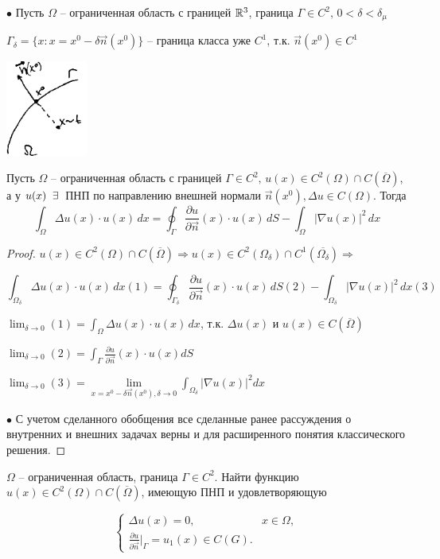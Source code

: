 $\bullet$ Пусть $\Omega$ -- ограниченная область с границей $\mathbb{R}^3$, граница $\Gamma \in C^2, \, 0 < \delta < \delta_{\mu}$

$\Gamma_{\delta} = \{x: x = x^0 - \delta \vec{n}(x^0)\}$ -- граница класса уже $C^1$, т.к. $\vec{n}(x^0) \in C^1$
\begin{center}
\includegraphics[width=0.2\textwidth]{32_2_new}
\end{center}
\begin{lemma}
Пусть $\Omega$ -- ограниченная область с границей $\Gamma \in C^2, \, u(x) \in C^2(\Omega) \cap C(\overline{\Omega})$, а у $u(x) \;\;\exists\: $ ПНП по направлению внешней нормали $\vec{n}(x^0), \Delta u \in C(\Omega)$. Тогда $$\int_{\Omega} \Delta u(x) \cdot u(x) \, dx = \oint_{\Gamma} \frac{\partial u}{\partial \vec{n}}(x) \cdot u(x) \, dS - \int_{\Omega} |\nabla u(x)|^2 \, dx $$
\end{lemma}
\begin{proof}
$u(x) \in C^2(\Omega) \cap C(\overline{\Omega}) \Rightarrow u(x) \in C^2(\Omega_{\delta}) \cap C^1(\overline{\Omega_{\delta}}) \Rightarrow $

$$\int_{\Omega_{\delta}} \Delta u(x) \cdot u(x) \, dx (1) = \oint_{\Gamma_{\delta}} \frac{\partial u}{\partial \vec{n}}(x) \cdot u(x) \, dS (2) - \int_{\Omega_{\delta}}|\nabla u(x)|^2 \, dx (3)$$

$\lim_{\delta \to 0}(1) = \int_{\Omega} \Delta u(x)  \cdot u(x) \, dx$, т.к. $\Delta u(x)$ и $u(x) \in C(\overline{\Omega})$

$\lim_{\delta \to 0}(2) = \int_{\Gamma} \frac{\partial u}{\partial \vec{n}}(x) \cdot u(x)dS $

$\lim_{\delta \to 0}(3) = \lim\limits_{x = x^0 - \delta \vec{n}(x^0), \delta \to 0} \int_{\Omega_{\delta}} |\nabla u(x)|^2dx$

$\bullet$ С учетом сделанного обобщения все сделанные ранее рассуждения о внутренних и внешних задачах верны и для расширенного понятия классического решения.
\end{proof}
\begin{theorem}
$\Omega$ -- ограниченная область, граница $\Gamma \in C^2$. Найти функцию $u(x) \in C^2(\Omega) \cap C(\overline{\Omega})$, имеющую ПНП и удовлетворяющую 

\begin{equation}
\begin{cases}
\Delta u(x) = 0, &x \in \Omega,
\\
\frac{\partial u}{\partial \vec{n}}\big|_{\Gamma} = u_1(x) \in C(G).
\end{cases}
\end{equation}
\end{theorem}
